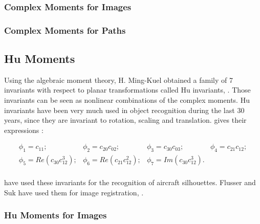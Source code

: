 \subsubsection{Complex Moments for Images}

\subsubsection{Complex Moments for Paths}


\subsection{Hu Moments}
\label{sec:HuMoments}
Using the algebraic moment theory, H. Ming-Kuel obtained a family of 7
invariants with respect to planar transformations called Hu invariants,
\cite{hu}. Those invariants can be seen as nonlinear combinations of
the complex moments. Hu invariants have
been very much used in object recognition during the last 30 years,
since they are invariant to rotation, scaling and translation. \cite{flusserinv} gives their expressions :

\begin{equation}
\begin{array}{cccc}
\phi_1 = c_{11};& \phi_2 = c_{20}c_{02};& \phi_3 = c_{30}c_{03};& \phi_4 = c_{21}c_{12};\\
\phi_5 = Re(c_{30}c_{12}^3);& \phi_6 = Re(c_{21}c_{12}^2);& \phi_7 = Im(c_{30}c_{12}^3).&\\
\end{array}
\end{equation}


\cite{dudani} have used these invariants for the recognition of
aircraft silhouettes. Flusser and Suk have used them for image
registration, \cite{flusser_2}.

\subsubsection{Hu Moments for Images}

%


